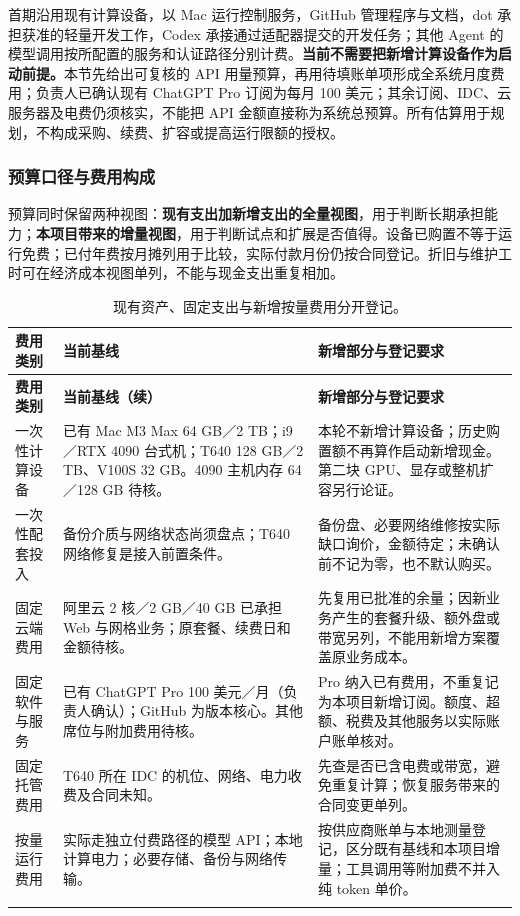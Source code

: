 \documentclass[11pt,a4paper]{article}
\begin{document}
首期沿用现有计算设备，以 Mac 运行控制服务，GitHub 管理程序与文档，dot 承担获准的轻量开发工作，Codex 承接通过适配器提交的开发任务；其他 Agent 的模型调用按所配置的服务和认证路径分别计费。\textbf{当前不需要把新增计算设备作为启动前提。}本节先给出可复核的 API 用量预算，再用待填账单项形成全系统月度费用；负责人已确认现有 ChatGPT Pro 订阅为每月 100 美元；其余订阅、IDC、云服务器及电费仍须核实，不能把 API 金额直接称为系统总预算。所有估算用于规划，不构成采购、续费、扩容或提高运行限额的授权。

\subsubsection{预算口径与费用构成}

预算同时保留两种视图：\textbf{现有支出加新增支出的全量视图}，用于判断长期承担能力；\textbf{本项目带来的增量视图}，用于判断试点和扩展是否值得。设备已购置不等于运行免费；已付年费按月摊列用于比较，实际付款月份仍按合同登记。折旧与维护工时可在经济成本视图单列，不能与现金支出重复相加。

\begingroup\small\renewcommand{\arraystretch}{1.15}
\begin{longtable}{P{2.3cm}P{6.8cm}P{5.6cm}}
\toprule
\textbf{费用类别} & \textbf{当前基线} & \textbf{新增部分与登记要求}\\
\midrule\endfirsthead
\toprule\textbf{费用类别} & \textbf{当前基线（续）} & \textbf{新增部分与登记要求}\\\midrule\endhead
一次性计算设备 & 已有 Mac M3 Max 64 GB／2 TB；i9／RTX 4090 台式机；T640 128 GB／2 TB、V100S 32 GB。4090 主机内存 64／128 GB 待核。 & 本轮不新增计算设备；历史购置额不再算作启动新增现金。第二块 GPU、显存或整机扩容另行论证。\\
一次性配套投入 & 备份介质与网络状态尚须盘点；T640 网络修复是接入前置条件。 & 备份盘、必要网络维修按实际缺口询价，金额待定；未确认前不记为零，也不默认购买。\\
固定云端费用 & 阿里云 2 核／2 GB／40 GB 已承担 Web 与网格业务；原套餐、续费日和金额待核。 & 先复用已批准的余量；因新业务产生的套餐升级、额外盘或带宽另列，不能用新增方案覆盖原业务成本。\\
固定软件与服务 & 已有 ChatGPT Pro 100 美元／月（负责人确认）；GitHub 为版本核心。其他席位与附加费用待核。 & Pro 纳入已有费用，不重复记为本项目新增订阅。额度、超额、税费及其他服务以实际账户账单核对。\\
固定托管费用 & T640 所在 IDC 的机位、网络、电力收费及合同未知。 & 先查是否已含电费或带宽，避免重复计算；恢复服务带来的合同变更单列。\\
按量运行费用 & 实际走独立付费路径的模型 API；本地计算电力；必要存储、备份与网络传输。 & 按供应商账单与本地测量登记，区分既有基线和本项目增量；工具调用等附加费不并入纯 token 单价。\\
\bottomrule
\caption{现有资产、固定支出与新增按量费用分开登记。}\\
\end{longtable}\endgroup
\end{document}
